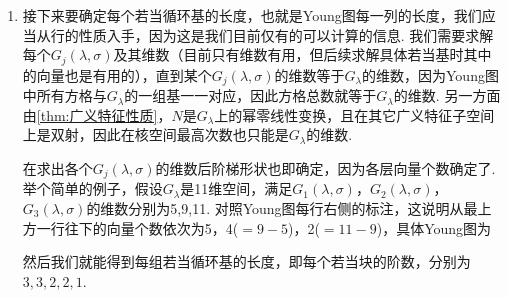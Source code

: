 \begin{enumerate}
    \item 接下来要确定每个若当循环基的长度，也就是Young图每一列的长度，我们应当从行的性质入手，因为这是我们目前仅有的可以计算的信息. 我们需要求解每个$G_j(\lambda,\sigma)$及其维数（目前只有维数有用，但后续求解具体若当基时其中的向量也是有用的），直到某个$G_j(\lambda,\sigma)$的维数等于$G_\lambda$的维数，因为Young图中所有方格与$G_\lambda$的一组基一一对应，因此方格总数就等于$G_\lambda$的维数. 另一方面由\autoref{thm:广义特征性质}，$N$是$G_\lambda$上的幂零线性变换，且在其它广义特征子空间上是双射，因此在核空间最高次数也只能是$G_\lambda$的维数.

          在求出各个$G_j(\lambda,\sigma)$的维数后阶梯形状也即确定，因为各层向量个数确定了. 举个简单的例子，假设$G_\lambda$是11维空间，满足$G_1(\lambda,\sigma)$，$G_2(\lambda,\sigma)$，$G_3(\lambda,\sigma)$的维数分别为5,9,11. 对照Young图每行右侧的标注，这说明从最上方一行往下的向量个数依次为5，4($=9-5$)，2($=11-9$)，具体Young图为
          \begin{figure}[H]
              \centering
          \end{figure}
          然后我们就能得到每组若当循环基的长度，即每个若当块的阶数，分别为$3,3,2,2,1$.
\end{enumerate}

